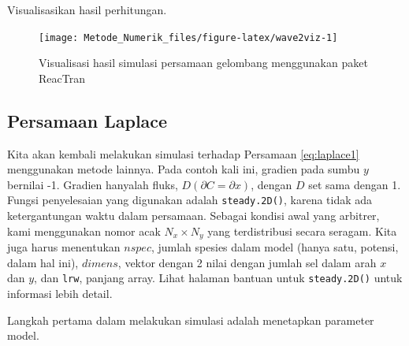 \documentclass[
]{book}
\newenvironment{Shaded}{\begin{snugshade}}{\end{snugshade}}
\newcommand{\AttributeTok}[1]{\textcolor[rgb]{0.13,0.29,0.53}{#1}}
\newcommand{\DecValTok}[1]{\textcolor[rgb]{0.00,0.00,0.81}{#1}}
\newcommand{\FunctionTok}[1]{\textcolor[rgb]{0.13,0.29,0.53}{\textbf{#1}}}
\newcommand{\NormalTok}[1]{#1}
\newcommand{\OtherTok}[1]{\textcolor[rgb]{0.56,0.35,0.01}{#1}}
\newcommand{\SpecialCharTok}[1]{\textcolor[rgb]{0.81,0.36,0.00}{\textbf{#1}}}
\theoremstyle{definition}
\theoremstyle{definition}
\theoremstyle{definition}
\theoremstyle{definition}
\theoremstyle{remark}
\begin{document}
Visualisasikan hasil perhitungan.

\begin{figure}

{\centering \texttt{[image: Metode\_Numerik\_files/figure-latex/wave2viz-1]} 

}

\caption{Visualisasi hasil simulasi persamaan gelombang menggunakan paket ReacTran}\label{fig:wave2viz}
\end{figure}

\hypertarget{persamaan-laplace}{%
\subsection{Persamaan Laplace}\label{persamaan-laplace}}

Kita akan kembali melakukan simulasi terhadap Persamaan \eqref{eq:laplace1} menggunakan metode lainnya. Pada contoh kali ini, gradien pada sumbu \(y\) bernilai -1. Gradien hanyalah fluks, \(D \left(\partial C = \partial x\right)\), dengan \(D\) set sama dengan 1. Fungsi penyelesaian yang digunakan adalah \texttt{steady.2D()}, karena tidak ada ketergantungan waktu dalam persamaan. Sebagai kondisi awal yang arbitrer, kami menggunakan nomor acak \(N_x \times N_y\) yang terdistribusi secara seragam. Kita juga harus menentukan \(nspec\), jumlah spesies dalam model (hanya satu, potensi, dalam hal ini), \(dimens\), vektor dengan 2 nilai dengan jumlah sel dalam arah \(x\) dan \(y\), dan \texttt{lrw}, panjang array. Lihat halaman bantuan untuk \texttt{steady.2D()} untuk informasi lebih detail.

Langkah pertama dalam melakukan simulasi adalah menetapkan parameter model.

\begin{Shaded}
\end{Shaded}
\end{document}
